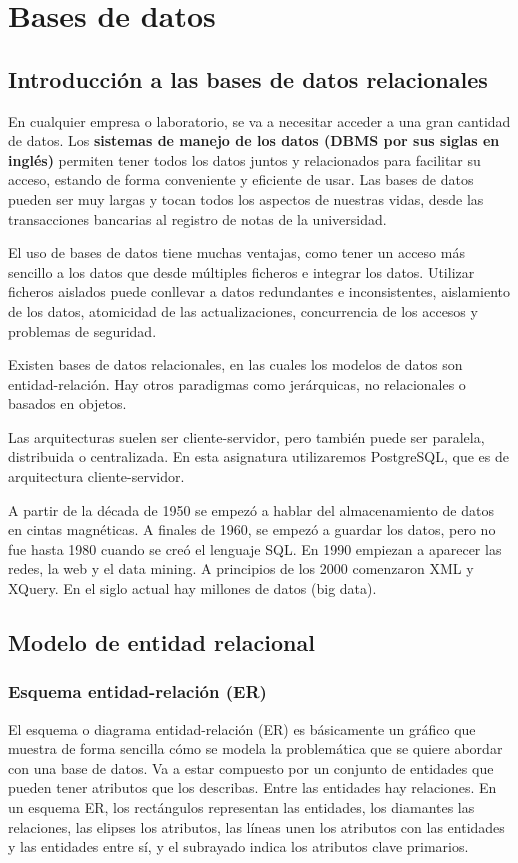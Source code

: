 \chapter{Bases de datos}
\section{Introducción a las bases de datos relacionales}
En cualquier empresa o laboratorio, se va a necesitar acceder a una gran cantidad de datos. Los \textbf{sistemas de manejo de los datos (DBMS por sus siglas en inglés)} permiten tener todos los datos juntos y relacionados para facilitar su acceso, estando de forma conveniente y eficiente de usar. Las bases de datos pueden ser muy largas y tocan todos los aspectos de nuestras vidas, desde las transacciones bancarias al registro de notas de la universidad. 

El uso de bases de datos tiene muchas ventajas, como tener un acceso más sencillo a los datos que desde múltiples ficheros e integrar los datos. Utilizar ficheros aislados puede conllevar a datos redundantes e inconsistentes, aislamiento de los datos, atomicidad de las actualizaciones, concurrencia de los accesos y problemas de seguridad.

Existen bases de datos relacionales, en las cuales los modelos de datos son entidad-relación. Hay otros paradigmas como jerárquicas, no relacionales o basados en objetos.

Las arquitecturas suelen ser cliente-servidor, pero también puede ser paralela, distribuida o centralizada. En esta asignatura utilizaremos PostgreSQL, que es de arquitectura cliente-servidor.

A partir de la década de 1950 se empezó a hablar del almacenamiento de datos en cintas magnéticas. A finales de 1960, se empezó a guardar los datos, pero no fue hasta 1980 cuando se creó el lenguaje SQL. En 1990 empiezan a aparecer las redes, la web y el data mining. A principios de los 2000 comenzaron XML y XQuery. En el siglo actual hay millones de datos (big data).

\section{Modelo de entidad relacional}
\subsection{Esquema entidad-relación (ER)}
El esquema o diagrama entidad-relación (ER) es básicamente un gráfico que muestra de forma sencilla cómo se modela la problemática que se quiere abordar con una base de datos. Va a estar compuesto por un conjunto de entidades que pueden tener atributos que los describas. Entre las entidades hay relaciones. En un esquema ER, los rectángulos representan las entidades, los diamantes las relaciones, las elipses los atributos, las líneas unen los atributos con las entidades y las entidades entre sí, y el subrayado indica los atributos clave primarios. 

